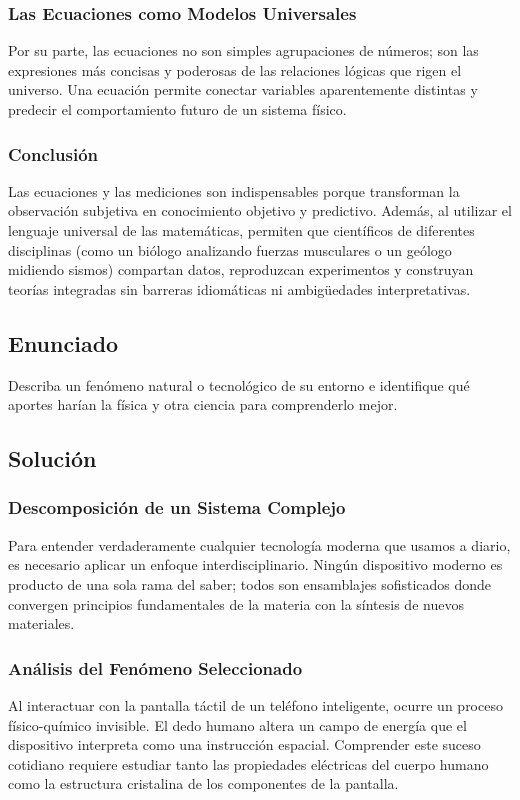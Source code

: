 \documentclass[12pt, a4paper]{article}
\begin{document}
\subsubsection*{Las Ecuaciones como Modelos Universales}
Por su parte, las ecuaciones no son simples agrupaciones de números; son las expresiones más concisas y poderosas de las relaciones lógicas que rigen el universo. Una ecuación permite conectar variables aparentemente distintas y predecir el comportamiento futuro de un sistema físico. 

\subsubsection*{Conclusión}
Las ecuaciones y las mediciones son indispensables porque transforman la observación subjetiva en conocimiento objetivo y predictivo. Además, al utilizar el lenguaje universal de las matemáticas, permiten que científicos de diferentes disciplinas (como un biólogo analizando fuerzas musculares o un geólogo midiendo sismos) compartan datos, reproduzcan experimentos y construyan teorías integradas sin barreras idiomáticas ni ambigüedades interpretativas.

\newpage

\subsection*{Enunciado}
Describa un fenómeno natural o tecnológico de su entorno e identifique qué aportes harían la física y otra ciencia para comprenderlo mejor.

\subsection*{Solución}

\subsubsection*{Descomposición de un Sistema Complejo}
Para entender verdaderamente cualquier tecnología moderna que usamos a diario, es necesario aplicar un enfoque interdisciplinario. Ningún dispositivo moderno es producto de una sola rama del saber; todos son ensamblajes sofisticados donde convergen principios fundamentales de la materia con la síntesis de nuevos materiales.

\subsubsection*{Análisis del Fenómeno Seleccionado}
Al interactuar con la pantalla táctil de un teléfono inteligente, ocurre un proceso físico-químico invisible. El dedo humano altera un campo de energía que el dispositivo interpreta como una instrucción espacial. Comprender este suceso cotidiano requiere estudiar tanto las propiedades eléctricas del cuerpo humano como la estructura cristalina de los componentes de la pantalla.
\end{document}
